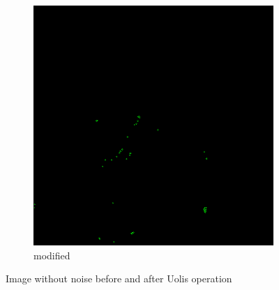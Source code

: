 \documentclass[12pt]{article}
\begin{document}
\begin{figure}[H]
\begin{subfigure}[t]{\subfiguresize}
        \includegraphics[width=\textwidth]{lena_uolis_clear.png}
        \caption{modified}
    \end{subfigure}
    \caption{Image without noise before and after Uolis operation}
\end{figure}
\end{document}
